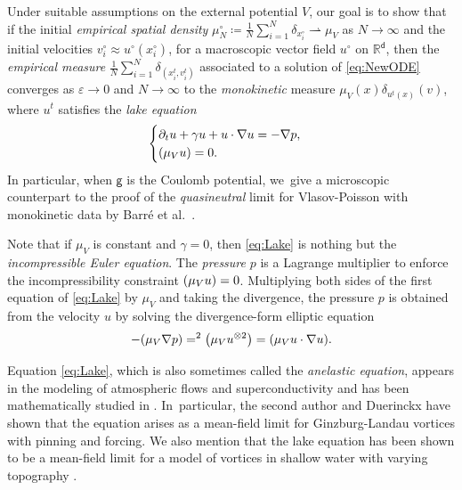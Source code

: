 \documentclass[10pt]{amsart}
\theoremstyle{plain}
\theoremstyle{definition}
\DeclarePairedDelimiter{\pa}{\lparen}{\rparen}
\let\div\relax
\DeclareMathOperator{\div}{\mathrm{div}}
\newcommand{\R}{{\mathbb{R}}}
\let\ga\gamma
\let\vep\varepsilon
\let\p\partial
\renewcommand{\d}{\mathsf{d}}
\newcommand{\g}{{\mathsf{g}}}
\begin{document}
Under suitable assumptions on the external potential $V$, our goal is to show that if the initial \emph{empirical spatial density} $\mu_N^\circ \coloneqq \frac1N\sum_{i=1}^N \delta_{x_i^\circ} \rightharpoonup \mu_V$ as $N\to\infty$ and the initial velocities $v_i^\circ \approx u^\circ(x_i^\circ)$, for a macroscopic vector field $u^\circ$ on $\R^\d$, then the \emph{empirical measure} $\frac{1}{N}\sum_{i=1}^N \delta_{(x_i^t,v_i^t)}$ associated to a solution of \eqref{eq:NewODE} converges as $\vep\to 0$ and $N\to\infty$ to the \emph{monokinetic} measure $\mu_V(x)\delta_{u^t(x)}(v)$, where $u^t$ satisfies the \emph{lake equation}
\begin{equation}\label{eq:Lake}
\begin{cases}
\p_t u +\ga u+ u \cdot\nabla u = -\nabla p,\\
\div(\mu_V u) = 0.
\end{cases}
\end{equation}
In particular, when $\g$ is the Coulomb potential, we~give a microscopic counterpart to the proof of the \emph{quasineutral} limit for Vlasov-Poisson with monokinetic data by Barré et al.\ \cite{BCGM2015}.

Note that if $\mu_V$ is constant and $\ga=0$, then \eqref{eq:Lake} is nothing but the \emph{incompressible Euler equation}. The \emph{pressure} $p$ is a Lagrange multiplier to enforce the incompressibility constraint $\div(\mu_V u)=0$. Multiplying both sides of the first equation of \eqref{eq:Lake} by $\mu_V$ and taking the divergence, the pressure $p$ is obtained from the velocity $u$ by solving the divergence-form elliptic equation
\begin{equation}\label{eq:press}
-\div\pa*{\mu_V\nabla p} = \div^{2}\pa*{\mu_V u^{\otimes 2}}= \div\pa*{\mu_V u\cdot\nabla u}.
\end{equation}

Equation \eqref{eq:Lake}, which is also sometimes called the \emph{anelastic equation}, appears in the modeling of atmospheric flows \cite{OP1962, Masmoudi2007} and superconductivity \cite{CR1997, DS2018, Duerinckx2018} and has been mathematically studied in \cite{LOT1996, LOT1996phy, BCGM2015, Duerinckx2018}. In~particular, the second author and Duerinckx \cite{DS2018} have shown that the equation arises as a mean-field limit for Ginzburg-Landau vortices with pinning and forcing. {We also mention that the lake equation has been shown \cite{Menard2023lake} to be a mean-field limit for a model of vortices in shallow water with varying topography \cite{Richardson2000}.}
\end{document}
